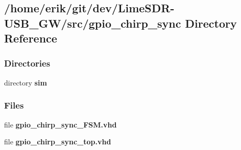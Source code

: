 \subsection{/home/erik/git/dev/\+Lime\+S\+D\+R-\/\+U\+S\+B\+\_\+\+G\+W/src/gpio\+\_\+chirp\+\_\+sync Directory Reference}
\label{dir_164f4454b611102001396ce747a8ce85}
\subsubsection*{Directories}
\begin{DoxyCompactItemize}
\item 
directory {\bf sim}
\end{DoxyCompactItemize}
\subsubsection*{Files}
\begin{DoxyCompactItemize}
\item 
file {\bf gpio\+\_\+chirp\+\_\+sync\+\_\+\+F\+S\+M.\+vhd}
\item 
file {\bf gpio\+\_\+chirp\+\_\+sync\+\_\+top.\+vhd}
\end{DoxyCompactItemize}
